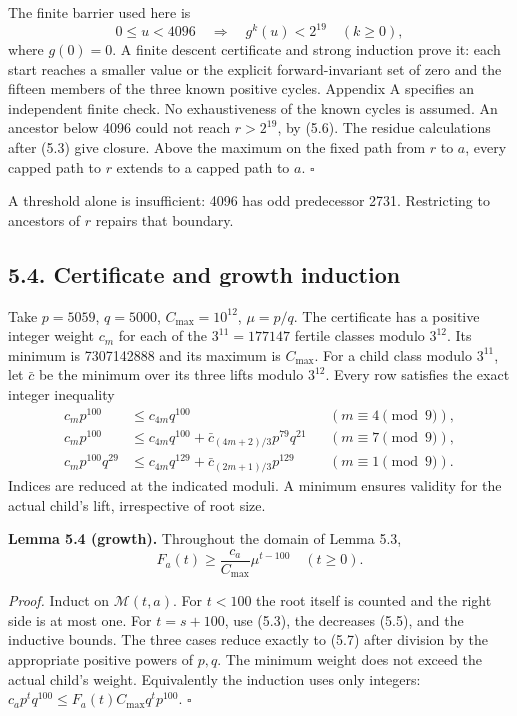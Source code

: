 \documentclass[11pt,a4paper]{article}
\begin{document}
The finite barrier used here is \[
0\le u<4096\quad\Longrightarrow\quad
g^k(u)<2^{19}\quad(k\ge0),
\tag{5.6}
\] where \(g(0)=0\). A finite descent certificate and strong induction
prove it: each start reaches a smaller value or the explicit
forward-invariant set of zero and the fifteen members of the three known
positive cycles. Appendix A specifies an independent finite check. No
exhaustiveness of the known cycles is assumed. An ancestor below 4096
could not reach \(r>2^{19}\), by (5.6). The residue calculations after
(5.3) give closure. Above the maximum on the fixed path from \(r\) to
\(a\), every capped path to \(r\) extends to a capped path to \(a\).
\(\square\)

A threshold alone is insufficient: 4096 has odd predecessor 2731.
Restricting to ancestors of \(r\) repairs that boundary.

\subsection{5.4. Certificate and growth
induction}\label{certificate-and-growth-induction}

Take \(p=5059\), \(q=5000\), \(C_{\max}=10^{12}\), \(\mu=p/q\). The
certificate has a positive integer weight \(c_m\) for each of the
\(3^{11}=177147\) fertile classes modulo \(3^{12}\). Its minimum is
7307142888 and its maximum is \(C_{\max}\). For a child class modulo
\(3^{11}\), let \(\bar c\) be the minimum over its three lifts modulo
\(3^{12}\). Every row satisfies the exact integer inequality \[
\begin{aligned}
c_m p^{100}&\le c_{4m}q^{100}
&& (m\equiv4\pmod9),\\
c_m p^{100}&\le c_{4m}q^{100}
 +\bar c_{(4m+2)/3}p^{79}q^{21}
&& (m\equiv7\pmod9),\\
c_m p^{100}q^{29}&\le c_{4m}q^{129}
 +\bar c_{(2m+1)/3}p^{129}
&& (m\equiv1\pmod9).
\end{aligned}
\tag{5.7}
\] Indices are reduced at the indicated moduli. A minimum ensures
validity for the actual child's lift, irrespective of root size.

\textbf{Lemma 5.4 (growth).} Throughout the domain of Lemma 5.3, \[
F_a(t)\ge\frac{c_a}{C_{\max}}\mu^{t-100}\quad(t\ge0).
\tag{5.8}
\]

\emph{Proof.} Induct on \(\mathcal M(t,a)\). For \(t<100\) the root
itself is counted and the right side is at most one. For \(t=s+100\),
use (5.3), the decreases (5.5), and the inductive bounds. The three
cases reduce exactly to (5.7) after division by the appropriate positive
powers of \(p,q\). The minimum weight does not exceed the actual child's
weight. Equivalently the induction uses only integers:
\(c_ap^tq^{100}\le F_a(t)C_{\max}q^tp^{100}\). \(\square\)
\end{document}
